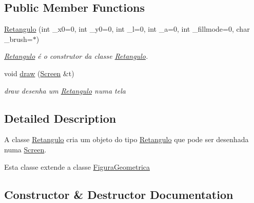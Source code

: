 \subsection*{Public Member Functions}
\begin{DoxyCompactItemize}
\item 
\hyperlink{class_retangulo_ad1646092a00ba28fcaa8390ce366f3b7}{Retangulo} (int \+\_\+x0=0, int \+\_\+y0=0, int \+\_\+l=0, int \+\_\+a=0, int \+\_\+fillmode=0, char \+\_\+brush=\textquotesingle{}$\ast$\textquotesingle{})
\begin{DoxyCompactList}\small\item\em \hyperlink{class_retangulo}{Retangulo} é o construtor da classe \hyperlink{class_retangulo}{Retangulo}. \end{DoxyCompactList}\item 
void \hyperlink{class_retangulo_ac088dd6d3f4f3d3f80363a868c2e74f1}{draw} (\hyperlink{class_screen}{Screen} \&t)
\begin{DoxyCompactList}\small\item\em draw desenha um \hyperlink{class_retangulo}{Retangulo} numa tela \end{DoxyCompactList}\end{DoxyCompactItemize}


\subsection{Detailed Description}
A classe \hyperlink{class_retangulo}{Retangulo} cria um objeto do tipo \hyperlink{class_retangulo}{Retangulo} que pode ser desenhada numa \hyperlink{class_screen}{Screen}. 

Esta classe extende a classe \hyperlink{class_figura_geometrica}{Figura\+Geometrica} 

\subsection{Constructor \& Destructor Documentation}

